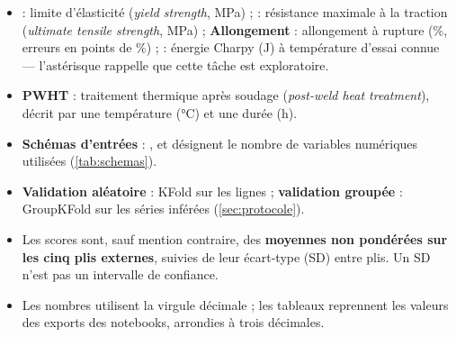 \begin{itemize}
  \item \textbf{\YS} : limite d'élasticité (\emph{yield strength}, MPa) ;
        \textbf{\UTS} : résistance maximale à la traction (\emph{ultimate tensile strength}, MPa) ;
        \textbf{Allongement} : allongement à rupture (\%, erreurs en points de \%) ;
        \textbf{\charpy} : énergie Charpy (J) à température d'essai connue --- l'astérisque rappelle que cette tâche est exploratoire.
  \item \textbf{PWHT} : traitement thermique après soudage (\emph{post-weld heat treatment}), décrit par une température (°C) et une durée (h).
  \item \textbf{Schémas d'entrées} :  \fg{},  \fg{} et  \fg{} désignent le nombre de variables numériques utilisées (\cref{tab:schemas}).
  \item \textbf{Validation aléatoire} : KFold sur les lignes ; \textbf{validation groupée} : GroupKFold sur les séries inférées (\cref{sec:protocole}).
  \item Les scores sont, sauf mention contraire, des \textbf{moyennes non pondérées sur les cinq plis externes}, suivies de leur écart-type (SD) entre plis. Un SD n'est pas un intervalle de confiance.
  \item Les nombres utilisent la virgule décimale ; les tableaux reprennent les valeurs des exports des notebooks, arrondies à trois décimales.
\end{itemize}
